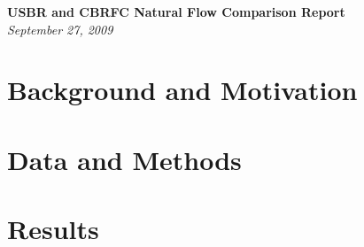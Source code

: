 \documentclass[11pt,oneside]{article}
\begin{document}
\begin{center}
	\textbf{\Large USBR and CBRFC Natural Flow Comparison Report}\\
	\itshape{September 27, 2009}
\end{center}
\tableofcontents

\section{Background and Motivation}

\section{Data and Methods}

\section{Results}
\end{document}
